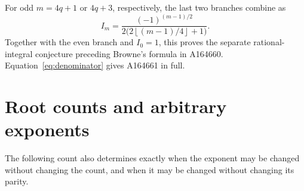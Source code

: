 \documentclass[11pt]{article}
\newcommand{\floor}[1]{\left\lfloor #1\right\rfloor}
\begin{document}
For odd $m=4q+1$ or $4q+3$, respectively, the last two branches combine as
\begin{equation}\label{eq:lang}
 I_m=\frac{(-1)^{(m-1)/2}}
 {2\bigl(2\floor{(m-1)/4}+1\bigr)}.
\end{equation}
Together with the even branch and $I_0=1$, this proves the separate
rational-integral conjecture preceding Browne's formula in A164660.
Equation~\eqref{eq:denominator} gives A164661 in full.

\section{Root counts and arbitrary exponents}
The following count also determines exactly when the exponent may be
changed without changing the count, and when it may be changed without
changing its parity.
\end{document}

